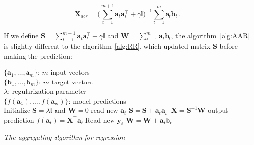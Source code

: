\begin{equation}
\label{eq:AARexpand}
\mathbf{X}_{aar} = \displaystyle \big (\sum_{t=1}^{m+1}
\mathbf{a}_t \mathbf{a}_t  ^\intercal + \gamma \mathbb{I}\big )^{-1}
\sum_{t=1}^m \mathbf{a}_t \mathbf{b}_t \, .
\end{equation}

If we define $\displaystyle\mathbf{S}= \sum_{t=1}^{m+1} \mathbf{a}_t
\mathbf{a}_t  ^\intercal + \gamma \mathbb{I} $ and $\mathbf{W}=
\displaystyle\sum_{t=1}^m \mathbf{a}_t \mathbf{b}_t$, the
algorithm~\ref{alg:AAR} is slightly different to the algorithm~\ref{alg:RR}, 
which updated matrix $\mathbf{S}$ before making the prediction:

\begin{algorithm}[ht]
\begin{algorithmic}[1]
\REQUIRE $\,$ \\
$\{\mathbf{a}_1,\dots,\mathbf{a}_{m} \}$: $m$ input vectors \\
$\{\mathbf{b}_1,\dots,\mathbf{b}_{m} \}$: $m$ target vectors \\
$\lambda$: regularization parameter \\
\ENSURE  $\,$ \\
$\{f(\mathbf{a}_1),\dots,f(\mathbf{a}_{m}) \}$: model predictions \\
\STATE Initialize $\mathbf{S}=\lambda \mathbb{I}$
and $\mathbf{W}=0$
	\STATE read new $\mathbf{a}_t$
   	\STATE $\mathbf{S} = \mathbf{S} + \mathbf{a}_t \mathbf{a}_t^\intercal$
	\STATE $\mathbf{X}=\mathbf{S}^{-1}\mathbf{W}$
	\STATE output prediction $f(\mathbf{a}_t) = \mathbf{X}^\intercal \mathbf{a}_t$
   	\STATE Read new $\mathbf{y}_t$
    	\STATE $\mathbf{W} = \mathbf{W} + \mathbf{a}_t \mathbf{b}_t$
\ENDFOR
\end{algorithmic}
\caption{{\em The aggregating algorithm for regression}}
\label{alg:AAR}
\end{algorithm}

